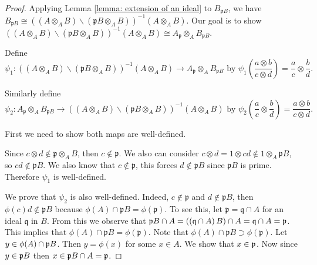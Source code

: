\documentclass[10pt,a4paper]{amsart}
\def\pp{{\frak p}}
\begin{document}
	\begin{proof}
	Applying Lemma \ref{lemma: extension of an ideal} to $B_{\mathfrak{p}B}$, we have $B_{\mathfrak{p}B} \cong ( (A \otimes_A B) \backslash (\mathfrak{p}B \otimes_A B) )^{-1} (A \otimes_A B)$. Our goal is to show $( (A \otimes_A B) \backslash (\mathfrak{p}B \otimes_A B) )^{-1} (A \otimes_A B) \cong A_{\mathfrak{p}} \otimes_A B_{\mathfrak{p}B}$.
	
	Define $$\psi_1 : ( (A \otimes_A B) \backslash (\mathfrak{p}B \otimes_A B) )^{-1} (A \otimes_A B) \rightarrow A_{\mathfrak{p}} \otimes_A B_{\mathfrak{p}B} \text{ by } \psi_1\left(\frac{a \otimes b}{c \otimes d}\right) = \frac{a}{c} \otimes \frac{b}{d}.   $$ %
	
	Similarly define  $$ \psi_2 : A_{\mathfrak{p}} \otimes_A B_{\mathfrak{p}B} \rightarrow ( (A \otimes_A B) \backslash (\mathfrak{p}B \otimes_A B) )^{-1} (A \otimes_A B) \text{ by } \psi_2\left(\frac{a}{c} \otimes \frac{b}{d}\right) = \frac{a \otimes b}{c \otimes d}.$$ %
	
	First we need to show both maps are well-defined. 
	
	Since $c \otimes d \notin \mathfrak{p} \otimes_A B$, then $c \notin \mathfrak{p}$. We also can consider $c \otimes d = 1 \otimes cd \notin 1 \otimes_A \mathfrak{p}B$, so $cd \notin \mathfrak{p}B$. We also know that $c \notin \mathfrak{p}$, this forces $d \notin \mathfrak{p}B$ since $\mathfrak{p}B$ is prime. Therefore $\psi_1$ is well-defined.
	
 We prove that	$\psi_2$ is also well-defined. Indeed, $c \notin \mathfrak{p}$ and $d \notin \mathfrak{p}B$, then $\phi(c)d \notin \mathfrak{p}B$ because $\phi(A) \cap \mathfrak{p}B = \phi(\mathfrak{p})$. To see this, let $\mathfrak{p} = \mathfrak{q}\cap A$ for an ideal $\mathfrak{q}$ in $B$. From this we  observe that $\mathfrak{p}B\cap A  = \left( \left( \mathfrak{q}\cap A\right) B\right) \cap A  = \mathfrak{q}\cap A=\pp$. This implies that $\phi(A) \cap \mathfrak{p}B = \phi(\mathfrak{p})$. Note that $\phi(A) \cap \mathfrak{p}B \supset \phi(\mathfrak{p})$. Let $y \in \phi(A)\cap \pp B$. Then $y=\phi(x)$ for some $x\in A$. We show that $x \in \pp$. Now since $y \in \pp B$ then $x\in \pp B\cap A=\pp$. 
 

\end{proof}
\end{document}
